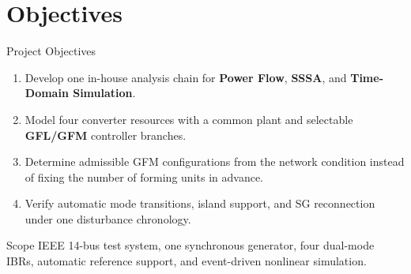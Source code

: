 \documentclass{beamer}
\begin{document}
\section{Objectives}
\begin{frame}{Project Objectives}
\small
\begin{enumerate}
  \item Develop one in-house analysis chain for \textbf{Power Flow}, \textbf{SSSA}, and \textbf{Time-Domain Simulation}.
  \item Model four converter resources with a common plant and selectable \textbf{GFL/GFM} controller branches.
  \item Determine admissible GFM configurations from the network condition instead of fixing the number of forming units in advance.
  \item Verify automatic mode transitions, island support, and SG reconnection under one disturbance chronology.
\end{enumerate}
\vspace{0.35cm}
\begin{block}{Scope}
IEEE 14-bus test system, one synchronous generator, four dual-mode IBRs, automatic reference support, and event-driven nonlinear simulation.
\end{block}
\end{frame}
\end{document}
